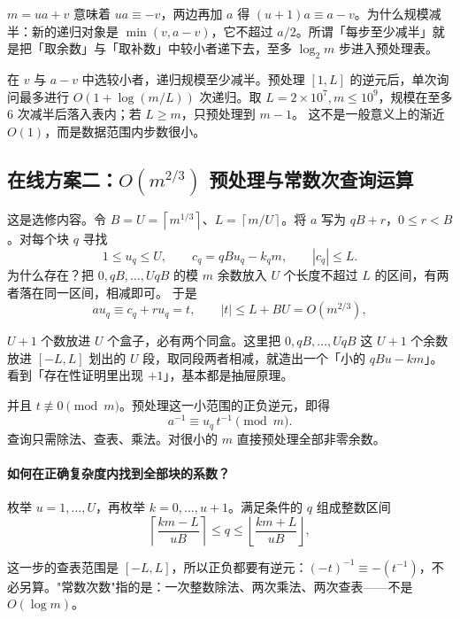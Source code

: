 \documentclass[UTF8,a4paper,11pt,twoside,openright,fontset=fandol]{ctexbook}
\theoremstyle{definition}
\newcommand{\floor}[1]{\left\lfloor #1\right\rfloor}
\newcommand{\ceil}[1]{\left\lceil #1\right\rceil}
\begin{document}
\begin{tip}[这个恒等式从哪来]
$m=ua+v$ 意味着 $ua\equiv-v$，两边再加 $a$ 得 $(u+1)a\equiv a-v$。为什么规模减半：新的递归对象是 $\min(v,a-v)$，它不超过 $a/2$。所谓「每步至少减半」就是把「取余数」与「取补数」中较小者递下去，至多 $\log_2 m$ 步进入预处理表。
\end{tip}

在 $v$ 与 $a-v$ 中选较小者，递归规模至少减半。预处理 $[1,L]$ 的逆元后，单次询问最多进行 $O(1+\log(m/L))$ 次递归。取 $L=2\times10^7,m\le10^9$，规模在至多 $6$ 次减半后落入表内；若 $L\ge m$，只预处理到 $m-1$。
这不是一般意义上的渐近 $O(1)$，而是数据范围内步数很小。

\subsection{在线方案二：\texorpdfstring{$O(m^{2/3})$}{O(m2/3)} 预处理与常数次查询运算}
这是选修内容。令 $B=U=\ceil{m^{1/3}}$、$L=\ceil{m/U}$。将 $a$ 写为 $qB+r$，$0\le r<B$。对每个块 $q$ 寻找
\[
1\le u_q\le U,\qquad c_q=qBu_q-k_qm,\qquad |c_q|\le L.
\]
为什么存在？把 $0,qB,\ldots,UqB$ 的模 $m$ 余数放入 $U$ 个长度不超过 $L$ 的区间，有两者落在同一区间，相减即可。
于是
\[
 a u_q\equiv c_q+ru_q=t,\qquad |t|\le L+BU=O(m^{2/3}),
\]

\begin{tip}[抽屉原理一句话]
$U+1$ 个数放进 $U$ 个盒子，必有两个同盒。这里把 $0,qB,\ldots,UqB$ 这 $U+1$ 个余数放进 $[-L,L]$ 划出的 $U$ 段，取同段两者相减，就造出一个「小的 $qBu-km$」。看到「存在性证明里出现 $+1$」，基本都是抽屉原理。
\end{tip}

并且 $t\not\equiv0\pmod m$。预处理这一小范围的正负逆元，即得
\[
 a^{-1}\equiv u_q\,t^{-1}\pmod m.
\]
查询只需除法、查表、乘法。对很小的 $m$ 直接预处理全部非零余数。

\paragraph{如何在正确复杂度内找到全部块的系数？}
枚举 $u=1,\ldots,U$，再枚举 $k=0,\ldots,u+1$。满足条件的 $q$ 组成整数区间
\[
 \ceil{\frac{km-L}{uB}}\le q\le\floor{\frac{km+L}{uB}},
\]

\begin{tip}
这一步的查表范围是 $[-L,L]$，所以正负都要有逆元：$(-t)^{-1}\equiv-(t^{-1})$，不必另算。"常数次数"指的是：一次整数除法、两次乘法、两次查表——不是 $O(\log m)$。
\end{tip}
\end{document}
